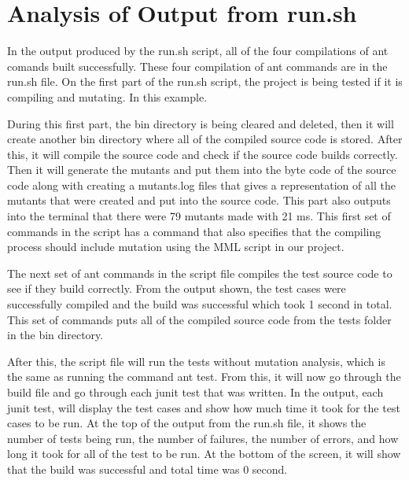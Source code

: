 \documentclass[12pt]{article}
\begin{document}
\vspace*{.1in}
\section{Analysis of Output from run.sh}
\label{sec:six}
\vspace*{-.1in}

In the output produced by the run.sh script, all of the four compilations of ant comands built successfully. These four compilation of ant commands are in the run.sh file.  On the first part of the run.sh script, the project is being tested if it is compiling and mutating. In this example.

During this first part, the bin directory is being cleared and deleted, then it will create another bin directory where all of the compiled source code is stored. After this, it will compile the source code and check if the source code builds correctly. Then it will generate the mutants and put them into the byte code of the source code along with creating a mutants.log files that gives a representation of all the mutants that were created and put into the source code. This part also outputs into the terminal that there were 79 mutants made with 21 ms. This first set of commands in the script has a command that also specifies that the compiling process should include mutation using the MML script in our project.

The next set of ant commands in the script file compiles the test source code to see if they build correctly. From the output shown, the test cases were successfully compiled and the build was successful which took 1 second in total. This set of commands puts all of the compiled source code from the tests folder in the bin directory. 

After this, the script file will run the tests without mutation analysis, which is the same as running the command ant test. From this, it will now go through the build file and go through each junit test that was written. In the output, each junit test, will display the test cases and show how much time it took for the test cases to be run. At the top of the output from the run.sh file, it shows the number of tests being run, the number of failures, the number of errors, and how long it took for all of the test to be run. At the bottom of the screen, it will show that the build was successful and total time was 0 second.
\end{document}
